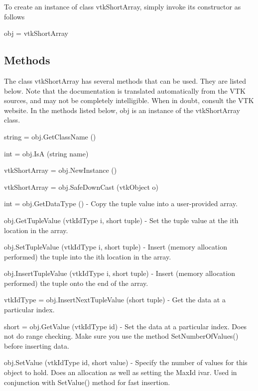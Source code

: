 To create an instance of class vtk\-Short\-Array, simply invoke its constructor as follows \begin{DoxyVerb}  obj = vtkShortArray
\end{DoxyVerb}
 \hypertarget{vtkwidgets_vtkxyplotwidget_Methods}{}\subsection{Methods}\label{vtkwidgets_vtkxyplotwidget_Methods}
The class vtk\-Short\-Array has several methods that can be used. They are listed below. Note that the documentation is translated automatically from the V\-T\-K sources, and may not be completely intelligible. When in doubt, consult the V\-T\-K website. In the methods listed below, {\ttfamily obj} is an instance of the vtk\-Short\-Array class. 
\begin{DoxyItemize}
\item {\ttfamily string = obj.\-Get\-Class\-Name ()}  
\item {\ttfamily int = obj.\-Is\-A (string name)}  
\item {\ttfamily vtk\-Short\-Array = obj.\-New\-Instance ()}  
\item {\ttfamily vtk\-Short\-Array = obj.\-Safe\-Down\-Cast (vtk\-Object o)}  
\item {\ttfamily int = obj.\-Get\-Data\-Type ()} -\/ Copy the tuple value into a user-\/provided array.  
\item {\ttfamily obj.\-Get\-Tuple\-Value (vtk\-Id\-Type i, short tuple)} -\/ Set the tuple value at the ith location in the array.  
\item {\ttfamily obj.\-Set\-Tuple\-Value (vtk\-Id\-Type i, short tuple)} -\/ Insert (memory allocation performed) the tuple into the ith location in the array.  
\item {\ttfamily obj.\-Insert\-Tuple\-Value (vtk\-Id\-Type i, short tuple)} -\/ Insert (memory allocation performed) the tuple onto the end of the array.  
\item {\ttfamily vtk\-Id\-Type = obj.\-Insert\-Next\-Tuple\-Value (short tuple)} -\/ Get the data at a particular index.  
\item {\ttfamily short = obj.\-Get\-Value (vtk\-Id\-Type id)} -\/ Set the data at a particular index. Does not do range checking. Make sure you use the method Set\-Number\-Of\-Values() before inserting data.  
\item {\ttfamily obj.\-Set\-Value (vtk\-Id\-Type id, short value)} -\/ Specify the number of values for this object to hold. Does an allocation as well as setting the Max\-Id ivar. Used in conjunction with Set\-Value() method for fast insertion.  

\end{DoxyItemize}
